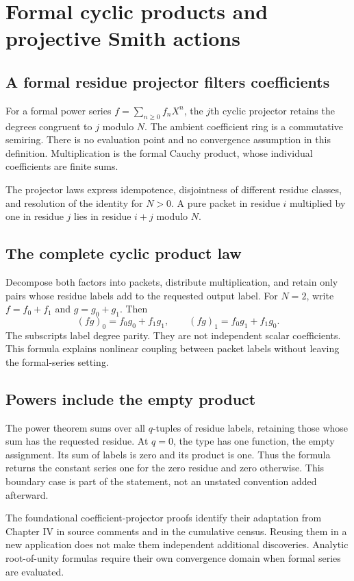 \section{Formal cyclic products and projective Smith actions}
\subsection{A formal residue projector filters coefficients}
For a formal power series $f=\sum_{n\ge0}f_nX^n$, the $j$th cyclic projector retains the degrees congruent to $j$ modulo $N$.
The ambient coefficient ring is a commutative semiring. There is no evaluation point and no convergence assumption in this definition. Multiplication is the formal Cauchy product, whose individual coefficients are finite sums.

The projector laws express idempotence, disjointness of different residue classes, and resolution of the identity for $N>0$. A pure packet in residue $i$ multiplied by one in residue $j$ lies in residue $i+j$ modulo $N$.

\subsection{The complete cyclic product law}
Decompose both factors into packets, distribute multiplication, and retain only pairs whose residue labels add to the requested output label.
For $N=2$, write $f=f_0+f_1$ and $g=g_0+g_1$. Then
\[
(fg)_0=f_0g_0+f_1g_1,\qquad (fg)_1=f_0g_1+f_1g_0.
\]
The subscripts label degree parity. They are not independent scalar coefficients. This formula explains nonlinear coupling between packet labels without leaving the formal-series setting.

\subsection{Powers include the empty product}
The power theorem sums over all $q$-tuples of residue labels, retaining those whose sum has the requested residue.
At $q=0$, the type  has one function, the empty assignment. Its sum of labels is zero and its product is one. Thus the formula returns the constant series one for the zero residue and zero otherwise. This boundary case is part of the statement, not an unstated convention added afterward.

The foundational coefficient-projector proofs identify their adaptation from Chapter IV in source comments and in the cumulative census. Reusing them in a new application does not make them independent additional discoveries. Analytic root-of-unity formulas require their own convergence domain when formal series are evaluated.

